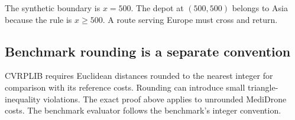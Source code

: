 The synthetic boundary is $x=500$. The depot at $(500,500)$ belongs to Asia because the rule is
$x\ge500$. A route serving Europe must cross and return.

\subsection*{Benchmark rounding is a separate convention}
CVRPLIB requires Euclidean distances rounded to the nearest integer for comparison with its
reference costs. Rounding can introduce small triangle-inequality violations. The exact proof
above applies to unrounded MediDrone costs. The benchmark evaluator follows the benchmark's
integer convention.

